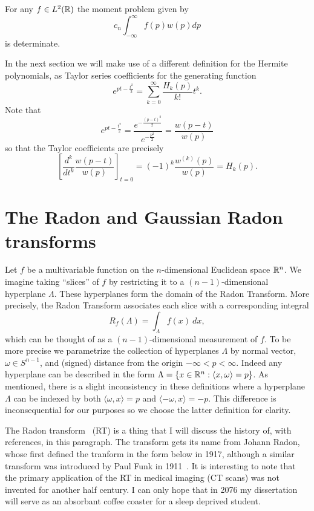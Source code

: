 \begin{corollary}
  For any $f \in L^2(\mathbb{R})$ the moment problem given by
  \[
    c_n \int_{-\infty}^\infty f(p) w(p) dp
  \]
  is determinate.
\end{corollary}

In the next section we will make use of a different definition for the Hermite polynomials, as Taylor series coefficients for the generating function 
\[
  e^{pt - \frac{t^2}2} = \sum_{k = 0}^\infty \frac{H_k(p)}{k!}t^k.
\]
Note that
\[
  e^{pt - \frac{t^2}2} 
    = \frac{e^{-\frac{(p-t)^2}2}}{e^{-\frac{p^2}2}} 
    = \frac{w(p - t)}{w(p)}
\]
so that the Taylor coefficients are precisely
\[
  \left[\frac{d^k}{dt^k}\frac{w(p - t)}{w(p)}\right]_{t = 0} 
    = (-1)^k \frac{w^{(k)}(p)}{w(p)} = H_k(p).
\]


\section{The Radon and Gaussian Radon transforms}

Let $f$ be a multivariable function on the $n$-dimensional Euclidean space $\mathbb{R}^n$. We imagine taking ``slices'' of $f$ by restricting it to a $(n-1)$-dimensional hyperplane $\Lambda$. These hyperplanes form the domain of the Radon Transform. More precisely, the Radon Transform associates each slice with a corresponding integral
\[
  R_f(\Lambda) = \int_{\Lambda} f(x) ~dx,
\]
which can be thought of as a $(n-1)$-dimensional measurement of $f$. To be more precise we parametrize the collection of hyperplanes $\Lambda$ by normal vector, $\omega \in S^{n-1}$, and (signed) distance from the origin $-\infty < p < \infty$. Indeed any hyperplane can be described in the form $\Lambda = \{x \in \mathbb{R}^n: \langle x, \omega\rangle = p\}$. As mentioned, there is a slight inconsistency in these definitions where a hyperplane $\Lambda$ can be indexed by both $\langle \omega, x \rangle = p$ and $\langle -\omega, x \rangle = -p$. This difference is inconsequential for our purposes so we choose the latter definition for clarity.

The Radon transform~\cite{Helg65} (RT) is a thing that I will discuss the history of, with references, in this paragraph. The transform gets its name from Johann Radon, whose first defined the tranform in the form below in 1917, although a similar transform was introduced by Paul Funk in 1911~\cite{????}. It is interesting to note that the primary application of the RT in medical imaging (CT scans) was not invented for another half century. I can only hope that in 2076 my dissertation will serve as an absorbant coffee coaster for a sleep deprived student.

